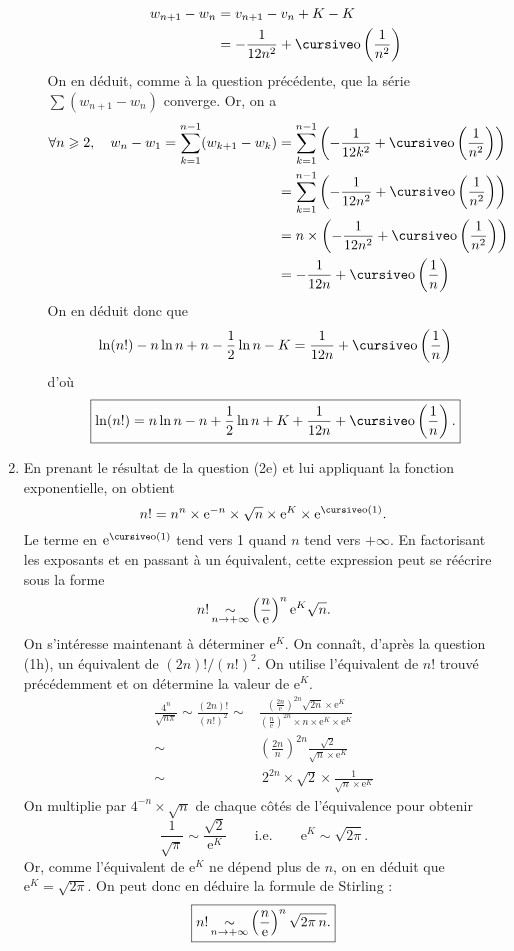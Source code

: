 \documentclass[a4paper]{article}
\begin{document}
\begin{enumerate}
\begin{enumerate}
					\begin{align*}
						w_{n+1} - w_n &= v_{n+1} - v_n + K - K \\
						&= - \frac{1}{12n^2} + \po\left( \frac{1}{n^2} \right) \\
					\end{align*}
					On en déduit, comme à la question précédente, que la série $\sum (w_{n+1} - w_n)$\/ converge. Or, on a
					\begin{align*}
						\forall n \ge 2,\quad w_n - w_1 = \sum_{k=1}^{n-1} (w_{k+1} - w_k) &= \sum_{k=1}^{n-1} \left( -\frac{1}{12k^2} + \po\left( \frac{1}{n^2} \right) \right)\\
						&= \sum_{k=1}^{n-1} \left( -\frac{1}{12n^2} + \po\left( \frac{1}{n^2} \right) \right)\\
						&= n \times \left( -\frac{1}{12n^2} + \po\left( \frac{1}{n^2} \right) \right)\\
						&= -\frac{1}{12n} + \po\left( \frac{1}{n} \right) \\
					\end{align*}
					On en déduit donc que \[
						\ln(n!) - n \ln n + n - \frac{1}{2} \ln n - K = \frac{1}{12n} + \po\left( \frac{1}{n} \right)
					\] d'où \[
					\boxed{\ln(n!) = n \ln n - n + \frac{1}{2} \ln n + K + \frac{1}{12n} + \po\left( \frac{1}{n} \right).}
					\] 
			\end{enumerate}
		\item En prenant le résultat de la question (2e) et lui appliquant la fonction exponentielle, on obtient \[
			n! = n^n \times \mathrm{e}^{-n} \times \sqrt{n} \times \mathrm{e}^K \times \mathrm{e}^{\po(1)}
		.\] Le terme en $\mathrm{e}^{\po(1)}$\/ tend vers 1 quand $n$\/ tend vers $+\infty$. En factorisant les exposants et en passant à un équivalent, cette expression peut se réécrire sous la forme \[
			n! \operatorname*{\sim}_{n\to +\infty} \left( \frac{n}{\mathrm{e}} \right)^n \mathrm{e}^K \sqrt{n}
		.\] On s'intéresse maintenant à déterminer $\mathrm{e}^K$. On connaît, d'après la question (1h), un équivalent de $(2n)! / (n!)^2$. On utilise l'équivalent de $n!$\/ trouvé précédemment et on détermine la valeur de $\mathrm{e}^K$.
		\begin{align*}
			\frac{4^n}{\sqrt{n\pi}} \sim \frac{(2n)!}{(n!)^2} \sim& \frac{\left( \frac{2n}{\mathrm{e}} \right)^{2n} \sqrt{2n} \times \mathrm{e}^K}{\left( \frac{n}{\mathrm{e}} \right)^{2n} \times n \times \mathrm{e}^K \times \mathrm{e}^K}\\
			\sim& \left( \frac{2n}{n} \right)^{2n} \frac{\sqrt{2}}{\sqrt{n}\times \mathrm{e}^K}\\
			\sim&\:2^{2n} \times \sqrt{2} \times \frac{1}{\sqrt{n} \times \mathrm{e}^K}
		\end{align*}
		On multiplie par $4^{-n} \times \sqrt{n}$\/ de chaque côtés de l'équivalence pour obtenir \[
			\frac{1}{\sqrt{\pi}} \sim \frac{\sqrt{2}}{\mathrm{e}^K}\qquad\text{i.e.}\qquad \mathrm{e}^K \sim \sqrt{2\pi}
		.\] Or, comme l'équivalent de $\mathrm{e}^K$\/ ne dépend plus de $n$, on en déduit que $\mathrm{e}^K = \sqrt{2\pi}$. On peut donc en déduire la formule de {\sc Stirling}\/ : \[
			\boxed{n! \operatorname*{\sim}_{n\to +\infty} \left( \frac{n}{\mathrm{e}} \right)^n \sqrt{2\pi\,n}.}
		\]
	\end{enumerate}
\end{document}
